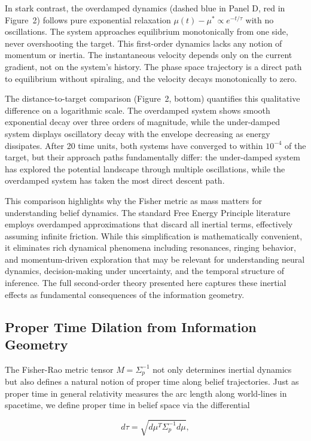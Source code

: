 \documentclass[11pt]{article}
\begin{document}
In stark contrast, the overdamped dynamics (dashed blue in Panel D, red in Figure~2) follows pure exponential relaxation $\mu(t) - \mu^* \propto e^{-t/\tau}$ with no oscillations. The system approaches equilibrium monotonically from one side, never overshooting the target. This first-order dynamics lacks any notion of momentum or inertia. The instantaneous velocity depends only on the current gradient, not on the system's history. The phase space trajectory is a direct path to equilibrium without spiraling, and the velocity decays monotonically to zero.

The distance-to-target comparison (Figure~2, bottom) quantifies this qualitative difference on a logarithmic scale. The overdamped system shows smooth exponential decay over three orders of magnitude, while the under-damped system displays oscillatory decay with the envelope decreasing as energy dissipates. After 20 time units, both systems have converged to within $10^{-4}$ of the target, but their approach paths fundamentally differ: the under-damped system has explored the potential landscape through multiple oscillations, while the overdamped system has taken the most direct descent path.

This comparison highlights why the Fisher metric as mass matters for understanding belief dynamics. The standard Free Energy Principle literature employs overdamped approximations that discard all inertial terms, effectively assuming infinite friction. While this simplification is mathematically convenient, it eliminates rich dynamical phenomena including resonances, ringing behavior, and momentum-driven exploration that may be relevant for understanding neural dynamics, decision-making under uncertainty, and the temporal structure of inference. The full second-order theory presented here captures these inertial effects as fundamental consequences of the information geometry.

\subsection{Proper Time Dilation from Information Geometry}

The Fisher-Rao metric tensor $M = \Sigma_p^{-1}$ not only determines inertial dynamics but also defines a natural notion of proper time along belief trajectories. Just as proper time in general relativity measures the arc length along world-lines in spacetime, we define proper time in belief space via the differential

\begin{equation}
d\tau = \sqrt{d\mu^T \Sigma_p^{-1} d\mu},
\end{equation}
\end{document}
